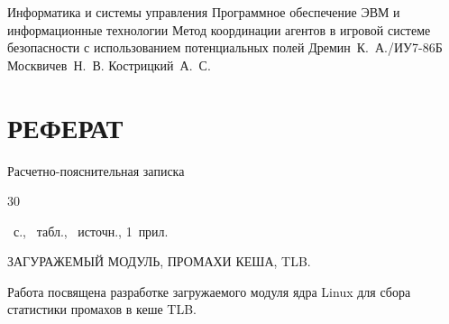 \documentclass{bmstu}
\begin{document}
\makethesistitle
{Информатика и системы управления}
{Программное обеспечение ЭВМ и информационные технологии}
{Метод координации агентов в игровой системе безопасности с использованием потенциальных полей}
{Дремин~К.~А./ИУ7-86Б}
{Москвичев~Н.~В.} %
{}
{Кострицкий~А.~С.}

\newenvironment{essay2}[1]
{
	\chapter*{РЕФЕРАТ}
	
	Расчетно-пояснительная записка \begin{NoHyper}30\end{NoHyper}~с., \tottab~табл., \thetotbibentries~источн.,  1~прил.
	
	\MakeUppercase{#1} \par
}{}

\setcounter{page}{3}
\begin{essay2}{загуражемый модуль, промахи кеша, TLB.}
	Работа посвящена разработке загружаемого модуля ядра Linux для сбора статистики промахов в кеше TLB.
	
	\iffalse
	В результате работы был проведен анализ предметной области координации агентов в многоагентных системах, описаны основные методы решения задачи.
	Сформулированы критерии сравнения и классификации описанных методов и выполнен их сравнительный анализ.
	\fi
\end{essay2}


\clearpage
{}
\setlength{\cftbeforetoctitleskip}{-22pt}
\renewcommand{\cftaftertoctitle}{\hfill}
\renewcommand{\contentsname}{\hfill\LARGE СОДЕРЖАНИЕ\hfill}
\tableofcontents

%
%



%
%
%
%
%


{}
{}
\printbibliography[title=СПИСОК ИСПОЛЬЗОВАННЫХ ИСТОЧНИКОВ]


\end{document}
